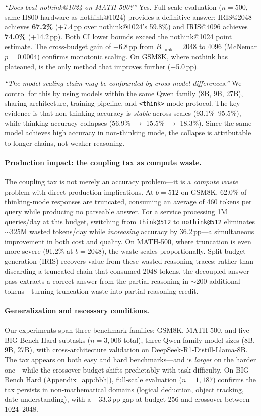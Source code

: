 \emph{``Does \method{} beat nothink@1024 on MATH-500?''}
Yes.
Full-scale evaluation ($n{=}500$, same H800 hardware as nothink@1024) provides a definitive answer: IRIS@2048 achieves \textbf{67.2\%}  (+7.4\,pp over nothink@1024's 59.8\%) and IRIS@4096 achieves \textbf{74.0\%}  (+14.2\,pp).
Both CI lower bounds exceed the nothink@1024 point estimate.
The cross-budget gain of +6.8\,pp from $B_{\text{think}}{=}2048$ to 4096 (McNemar $p{=}0.0004$) confirms monotonic scaling.
On GSM8K, where nothink has plateaued, \method{} is the only method that improves further (+5.0\,pp).

\emph{``The model scaling claim may be confounded by cross-model differences.''}
We control for this by using models within the same Qwen family (8B, 9B, 27B), sharing architecture, training pipeline, and \texttt{<think>} mode protocol.
The key evidence is that non-thinking accuracy is \emph{stable} across scales (93.1\%--95.5\%), while thinking accuracy collapses (56.9\% $\to$ 15.5\% $\to$ 18.3\%).
Since the same model achieves high accuracy in non-thinking mode, the collapse is attributable to longer chains, not weaker reasoning.

\paragraph{Production impact: the coupling tax as compute waste.}
The coupling tax is not merely an accuracy problem---it is a
\emph{compute waste} problem with direct production implications.
At $b{=}512$ on GSM8K, 62.0\% of thinking-mode responses are truncated,
consuming an average of 460 tokens per query while producing no
parseable answer.
For a service processing 1M queries/day at this budget, switching
from \texttt{think@512} to \texttt{nothink@512} eliminates
${\sim}$325M wasted tokens/day while \emph{increasing} accuracy by
36.2\,pp---a simultaneous improvement in both cost and quality.
On MATH-500, where truncation is even more severe (91.2\% at $b{=}2048$),
the waste scales proportionally.
Split-budget generation (IRIS) recovers value from these wasted
reasoning traces: rather than discarding a truncated chain that consumed
2048 tokens, the decoupled answer pass extracts a correct answer
from the partial reasoning in ${\sim}$200 additional tokens---turning
truncation waste into partial-reasoning credit.

\paragraph{Generalization and necessary conditions.}
Our experiments span three benchmark families: GSM8K, MATH-500, and five BIG-Bench Hard subtasks ($n{=}3{,}006$ total), three Qwen-family model sizes (8B, 9B, 27B), with cross-architecture validation on DeepSeek-R1-Distill-Llama-8B.
The tax appears on both easy and hard benchmarks---and is \emph{larger} on the harder one---while the crossover budget shifts predictably with task difficulty.
On BIG-Bench Hard (Appendix~\ref{app:bbh}), full-scale evaluation ($n{=}1{,}187$) confirms the tax persists in non-mathematical domains (logical deduction, object tracking, date understanding), with a +33.3\,pp gap at budget 256 and crossover between 1024--2048.

